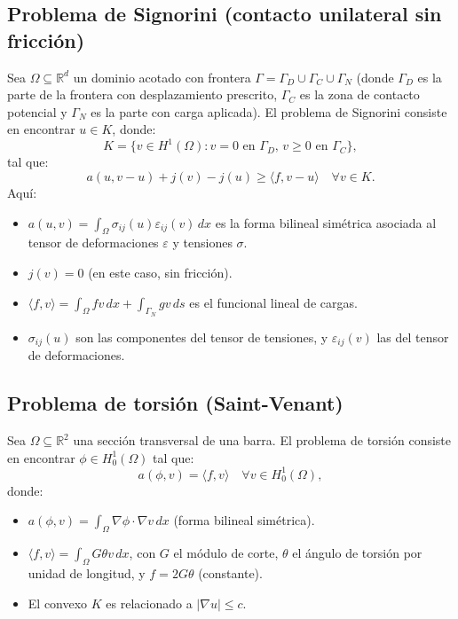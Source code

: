 \documentclass[12pt]{book}
\theoremstyle{definition}
\theoremstyle{plain}
\theoremstyle{remark}
\begin{document}
\subsection{Problema de Signorini (contacto unilateral sin fricción)}
Sea \( \Omega \subseteq \mathbb{R}^d \) un dominio acotado con frontera \( \Gamma = \Gamma_D \cup \Gamma_C \cup \Gamma_N \) (donde \( \Gamma_D \) es la parte de la frontera con desplazamiento prescrito, \( \Gamma_C \) es la zona de contacto potencial y \( \Gamma_N \) es la parte con carga aplicada).
El problema de Signorini consiste en encontrar \( u \in K \), donde:
\[
K = \{ v \in H^1(\Omega) \colon v = 0 \text{ en } \Gamma_D, \, v \geq 0 \text{ en } \Gamma_C \},
\]
tal que:
\[
a(u, v - u) + j(v) - j(u) \geq \langle f, v - u \rangle \quad \forall v \in K.
\]
Aquí:
\begin{itemize}
    \item \( a(u, v) = \int_\Omega \sigma_{ij}(u) \varepsilon_{ij}(v) \, dx \) es la forma bilineal simétrica asociada al tensor de deformaciones \( \varepsilon \) y tensiones \( \sigma \).
    \item \( j(v) = 0 \) (en este caso, sin fricción).
    \item \( \langle f, v \rangle = \int_\Omega f v \, dx + \int_{\Gamma_N} g v \, ds \) es el funcional lineal de cargas.
    \item \( \sigma_{ij}(u) \) son las componentes del tensor de tensiones, y \( \varepsilon_{ij}(v) \) las del tensor de deformaciones.
\end{itemize}

\subsection{Problema de torsión (Saint-Venant)}
Sea \( \Omega \subseteq \mathbb{R}^2 \) una sección transversal de una barra. El problema de torsión consiste en encontrar \( \phi \in H^1_0(\Omega) \) tal que:
\[
a(\phi, v) = \langle f, v \rangle \quad \forall v \in H^1_0(\Omega),
\]
donde:
\begin{itemize}
    \item \( a(\phi, v) = \int_\Omega \nabla \phi \cdot \nabla v \, dx \) (forma bilineal simétrica).
    \item \( \langle f, v \rangle = \int_\Omega G \theta v \, dx \), con \( G \) el módulo de corte, \( \theta \) el ángulo de torsión por unidad de longitud, y \( f = 2G\theta \) (constante).
    \item El convexo $K$ es relacionado a $|\nabla u| \leq c$.
\end{itemize}
\end{document}
